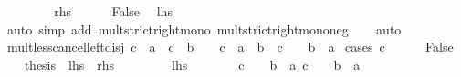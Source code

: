 \begin{isabellebody}
\ \ \isamarkupfalse%
\isanewline
\ \ \ \ \isamarkupfalse%
\ {\isacharquery}{\kern0pt}rhs\isanewline
\ \ \ \ \isamarkupfalse%
\ False\ \isamarkupfalse%
\ {\isacharquery}{\kern0pt}lhs\ \isanewline
\ \ \ \ \ \ \isamarkupfalse%
\ {\isacharparenleft}{\kern0pt}auto\ simp\ add{\isacharcolon}{\kern0pt}\ mult{\isacharunderscore}{\kern0pt}strict{\isacharunderscore}{\kern0pt}right{\isacharunderscore}{\kern0pt}mono\ mult{\isacharunderscore}{\kern0pt}strict{\isacharunderscore}{\kern0pt}right{\isacharunderscore}{\kern0pt}mono{\isacharunderscore}{\kern0pt}neg{\isacharparenright}{\kern0pt}\isanewline
\ \ \isamarkupfalse%
\isanewline
{}\isamarkupfalse%
\ auto%
\endisatagproof
{\isafoldproof}%
%
\isadelimproof
\isanewline
%
\endisadelimproof
\isanewline
{}\isamarkupfalse%
\ mult{\isacharunderscore}{\kern0pt}less{\isacharunderscore}{\kern0pt}cancel{\isacharunderscore}{\kern0pt}left{\isacharunderscore}{\kern0pt}disj{\isacharcolon}{\kern0pt}\ {\isachardoublequoteopen}c\ {\isacharasterisk}{\kern0pt}\ a\ {\isacharless}{\kern0pt}\ c\ {\isacharasterisk}{\kern0pt}\ b\ {\isasymlongleftrightarrow}\ {}\ {\isacharless}{\kern0pt}\ c\ {\isasymand}\ a\ {\isacharless}{\kern0pt}\ b\ {\isasymor}\ c\ {\isacharless}{\kern0pt}\ {}\ {\isasymand}\ b\ {\isacharless}{\kern0pt}\ a{\isachardoublequoteclose}\isanewline
%
\isadelimproof
%
\endisadelimproof
%
\isatagproof
{}\isamarkupfalse%
\ {\isacharparenleft}{\kern0pt}cases\ {\isachardoublequoteopen}c\ {\isacharequal}{\kern0pt}\ {}{\isachardoublequoteclose}{\isacharparenright}{\kern0pt}\isanewline
\ \ \isamarkupfalse%
\ False\isanewline
\ \ \isamarkupfalse%
\ {\isacharquery}{\kern0pt}thesis\ {\isacharparenleft}{\kern0pt}\ {\isachardoublequoteopen}{\isacharquery}{\kern0pt}lhs\ {\isasymlongleftrightarrow}\ {\isacharquery}{\kern0pt}rhs{\isachardoublequoteclose}{\isacharparenright}{\kern0pt}\isanewline
\ \ \isamarkupfalse%
\isanewline
\ \ \ \ \isamarkupfalse%
\ {\isacharquery}{\kern0pt}lhs\isanewline
\ \ \ \ \isamarkupfalse%
\ \isamarkupfalse%
\ {\isachardoublequoteopen}c\ {\isacharless}{\kern0pt}\ {}\ {\isasymLongrightarrow}\ b\ {\isacharless}{\kern0pt}\ a{\isachardoublequoteclose}\ {\isachardoublequoteopen}c\ {\isachargreater}{\kern0pt}\ {}\ {\isasymLongrightarrow}\ b\ {\isachargreater}{\kern0pt}\ a{\isachardoublequoteclose}\isanewline

\end{isabellebody}
